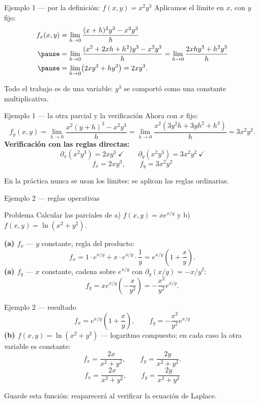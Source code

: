 \documentclass[11pt,aspectratio=169]{beamer}
\begin{document}
\begin{frame}{Ejemplo 1 --- por la definición: $f(x,y)=x^2y^3$}
  Aplicamos el límite en $x$, con $y$ fijo:
  \pause
  \begin{align*}
    f_x(x,y) &= \lim_{h\to 0}\frac{(x+h)^2y^3 - x^2y^3}{h}\\
    \pause
    &= \lim_{h\to 0}\frac{(x^2+2xh+h^2)y^3 - x^2y^3}{h}
     = \lim_{h\to 0}\frac{2xhy^3 + h^2y^3}{h}\\
    \pause
    &= \lim_{h\to 0}\bigl(2xy^3 + hy^3\bigr) = 2xy^3.
  \end{align*}
  \pause
  \begin{center}\small\color{gray60} Todo el trabajo es de una variable: $y^3$ se comportó como una constante multiplicativa.\end{center}
\end{frame}

\begin{frame}{Ejemplo 1 --- la otra parcial y la verificación}
  Ahora con $x$ fijo:
  \[
    f_y(x,y)=\lim_{h\to 0}\frac{x^2(y+h)^3-x^2y^3}{h}
    =\lim_{h\to 0}\frac{x^2(3y^2h+3yh^2+h^3)}{h}
    =3x^2y^2.
  \]
  \pause
  \textbf{Verificación con las reglas directas:}
  \[
    \partial_x(x^2y^3)=2xy^3\ \checkmark
    \qquad
    \partial_y(x^2y^3)=3x^2y^2\ \checkmark
  \]
  \pause
  \[
    \boxed{f_x=2xy^3,\qquad f_y=3x^2y^2}
  \]
  \pause
  \begin{center}\small\color{gray60} En la práctica nunca se usan los límites: se aplican las reglas ordinarias.\end{center}
\end{frame}

\begin{frame}{Ejemplo 2 --- reglas operativas}
  \begin{block}{Problema}
    Calcular las parciales de a) $f(x,y)=xe^{x/y}$ \quad y \quad b) $f(x,y)=\ln(x^2+y^2)$.
  \end{block}
  \pause
  \textbf{(a) $f_x$} --- $y$ constante, regla del producto:
  \[
    f_x = 1\cdot e^{x/y} + x\cdot e^{x/y}\cdot\frac{1}{y}
        = e^{x/y}\left(1+\frac{x}{y}\right).
  \]
  \pause
  \textbf{(a) $f_y$} --- $x$ constante, cadena sobre $e^{x/y}$ con $\partial_y(x/y)=-x/y^2$:
  \[
    f_y = xe^{x/y}\left(-\frac{x}{y^2}\right) = -\frac{x^2}{y^2}e^{x/y}.
  \]
\end{frame}

\begin{frame}{Ejemplo 2 --- resultado}
  \[
    \boxed{f_x=e^{x/y}\!\left(1+\frac{x}{y}\right),\qquad f_y=-\frac{x^2}{y^2}e^{x/y}}
  \]
  \pause
  \vspace{6pt}
  \textbf{(b) $f(x,y)=\ln(x^2+y^2)$} --- logaritmo compuesto; en cada caso la otra variable es constante:
  \[
    f_x=\frac{2x}{x^2+y^2},\qquad f_y=\frac{2y}{x^2+y^2}.
  \]
  \pause
  \[
    \boxed{f_x=\frac{2x}{x^2+y^2},\qquad f_y=\frac{2y}{x^2+y^2}}
  \]
  \pause
  \begin{center}\small\color{tealx} Guarde esta función: reaparecerá al verificar la ecuación de Laplace.\end{center}
\end{frame}
\end{document}
